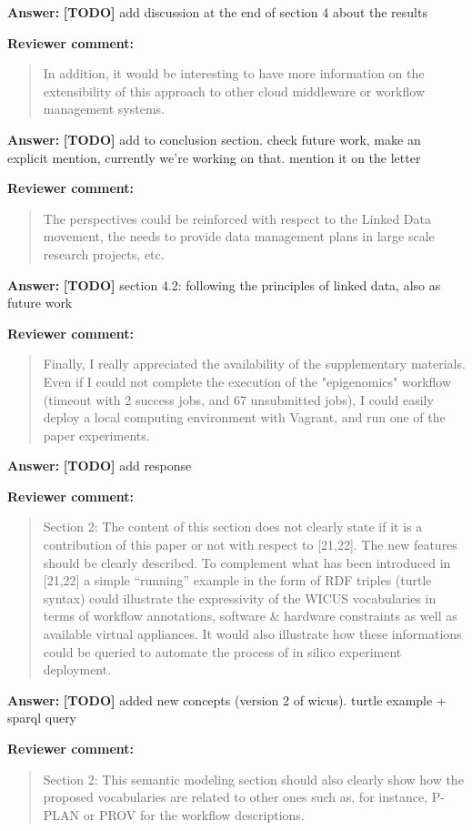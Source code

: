 \documentclass{letter}
\newenvironment{review}%
{\textbf{Reviewer comment:}\begin{quote}}%
{\end{quote}}%
\newcommand{\todo}[1]{%
      \color{red}\textbf{[TODO]} #1\color{black}}
\newcommand{\answer}[1]{%
      \textbf{Answer:} #1}
\begin{document}
\begin{letter}{}
\answer{\todo{add discussion at the end of section 4 about the results}}


\begin{review}
In addition, it would be interesting to have more information on the extensibility of this approach to other cloud middleware or workflow management systems.
\end{review}

\answer{\todo{add to conclusion section. check future work, make an explicit mention, currently we're working on that. mention it on the letter}}


\begin{review}
The perspectives could be reinforced with respect to the Linked Data movement, the needs to provide data management plans in large scale research projects, etc.
\end{review}

\answer{\todo{section 4.2: following the principles of linked data, also as future work}}


\begin{review}
Finally, I really appreciated the availability of the supplementary materials. Even if I could not complete the execution of the "epigenomics" workflow (timeout with 2 success jobs, and 67 unsubmitted jobs), I could easily deploy a local computing environment with Vagrant, and run one of the paper experiments.
\end{review}

\answer{\todo{add response}}


\begin{review}
Section 2: The content of this section does not clearly state if it is a contribution of this paper or not with respect to [21,22]. The new features should be clearly described. To complement what has been introduced in [21,22] a simple ``running'' example in the form of RDF triples (turtle syntax) could illustrate the expressivity of the WICUS vocabularies in terms of workflow annotations, software \& hardware constraints as well as available virtual appliances. It would also illustrate how these informations could be queried to automate the process of in silico experiment deployment.
\end{review}

\answer{\todo{added new concepts (version 2 of wicus). turtle example + sparql query}}


\begin{review}
Section 2: This semantic modeling section should also clearly show how the proposed vocabularies are related to other ones such as, for instance, P-PLAN or PROV for the workflow descriptions.
\end{review}


\end{letter}
\end{document}
